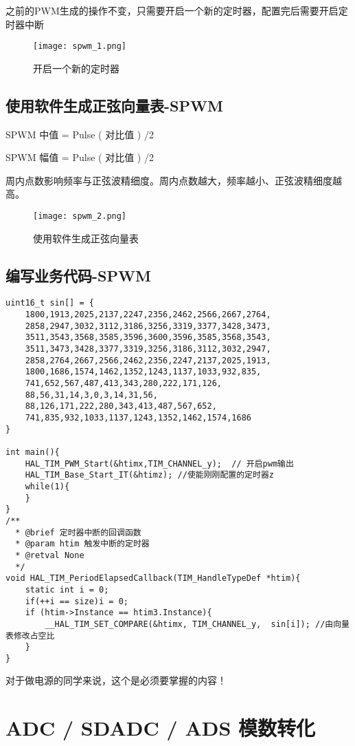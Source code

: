 \documentclass[cn,11pt]{elegantbook}
\begin{document}
之前的PWM生成的操作不变，只需要开启一个新的定时器，配置完后需要开启定时器中断

\begin{figure}[htbp]
	\centering
	\texttt{[image: spwm\_1.png]}
	\caption{开启一个新的定时器 \label{fig:scatter}}
\end{figure}
\newpage
\subsection{使用软件生成正弦向量表-SPWM}
SPWM 中值 = Pulse ( 对比值 ) /2

SPWM 幅值 = Pulse ( 对比值 ) /2

周内点数影响频率与正弦波精细度。周内点数越大，频率越小、正弦波精细度越高。

\begin{figure}[htbp]
	\centering
	\texttt{[image: spwm\_2.png]}
	\caption{使用软件生成正弦向量表 \label{fig:scatter}}
\end{figure}

\subsection{编写业务代码-SPWM}

\lstset{language=C}
\begin{lstlisting}
uint16_t sin[] = {
	1800,1913,2025,2137,2247,2356,2462,2566,2667,2764,
	2858,2947,3032,3112,3186,3256,3319,3377,3428,3473,
	3511,3543,3568,3585,3596,3600,3596,3585,3568,3543,
	3511,3473,3428,3377,3319,3256,3186,3112,3032,2947,
	2858,2764,2667,2566,2462,2356,2247,2137,2025,1913,
	1800,1686,1574,1462,1352,1243,1137,1033,932,835,
	741,652,567,487,413,343,280,222,171,126,
	88,56,31,14,3,0,3,14,31,56,
	88,126,171,222,280,343,413,487,567,652,
	741,835,932,1033,1137,1243,1352,1462,1574,1686
}

int main(){
	HAL_TIM_PWM_Start(&htimx,TIM_CHANNEL_y);  // 开启pwm输出
	HAL_TIM_Base_Start_IT(&htimz); //使能刚刚配置的定时器z
	while(1){
	}
}
/**
  * @brief 定时器中断的回调函数
  * @param htim 触发中断的定时器
  * @retval None
  */
void HAL_TIM_PeriodElapsedCallback(TIM_HandleTypeDef *htim){
	static int i = 0;
	if(++i == size)i = 0;
	if (htim->Instance == htim3.Instance){
		__HAL_TIM_SET_COMPARE(&htimx, TIM_CHANNEL_y,  sin[i]); //由向量表修改占空比
	}
}
\end{lstlisting}
对于做电源的同学来说，这个是必须要掌握的内容！


\section{ADC / SDADC / ADS 模数转化}
\end{document}
